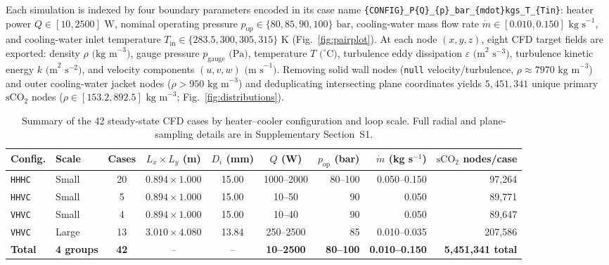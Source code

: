\documentclass[11pt]{article}
\begin{document}
Each simulation is indexed by four boundary parameters encoded in its case name \texttt{\{CONFIG\}\_P\{Q\}\_\{p\}\_bar\_\{mdot\}kgs\_T\_\{Tin\}}: heater power $Q \in [10, 2500]\text{ W}$, nominal operating pressure $p_{\mathrm{op}} \in \{80, 85, 90, 100\}\text{ bar}$, cooling-water mass flow rate $\dot{m} \in [0.010, 0.150]\text{ kg s}^{-1}$, and cooling-water inlet temperature $T_{\mathrm{in}} \in \{283.5, 300, 305, 315\}\text{ K}$ (Fig.~\ref{fig:pairplot}). At each node $(x,y,z)$, eight CFD target fields are exported: density $\rho\text{ (kg m}^{-3}\text{)}$, gauge pressure $p_{\mathrm{gauge}}\text{ (Pa)}$, temperature $T\text{ (}^\circ\text{C)}$, turbulence eddy dissipation $\varepsilon\text{ (m}^2\text{ s}^{-3}\text{)}$, turbulence kinetic energy $k\text{ (m}^2\text{ s}^{-2}\text{)}$, and velocity components $(u,v,w)\text{ (m s}^{-1}\text{)}$. Removing solid wall nodes (\texttt{null} velocity/turbulence, $\rho \approx 7970\text{ kg m}^{-3}$) and outer cooling-water jacket nodes ($\rho > 950\text{ kg m}^{-3}$) and deduplicating intersecting plane coordinates yields $5,451,341$ unique primary $\mathrm{sCO}_2$ nodes ($\rho \in [153.2, 892.5]\text{ kg m}^{-3}$; Fig.~\ref{fig:distributions}).

\begin{table}[!htbp]
\centering
\caption{Summary of the 42 steady-state CFD cases by heater--cooler configuration and loop scale. Full radial and plane-sampling details are in Supplementary Section~S1.}
\label{tab:dataset}
\small
\setlength{\tabcolsep}{4.8pt}
\begin{tabular}{llccccrrr}
\toprule
Config. & Scale & Cases & $L_x \times L_y$ (m) & $D_i$ (mm) & $Q$ (W) & $p_{\mathrm{op}}$ (bar) & $\dot{m}$ (kg s$^{-1}$) & $\mathrm{sCO}_2$ nodes/case \\
\midrule
\texttt{HHHC} & Small & 20 & $0.894 \times 1.000$ & 15.00 & 1000--2000 & 80--100 & 0.050--0.150 & 97,264 \\
\texttt{HHVC} & Small & 5  & $0.894 \times 1.000$ & 15.00 & 10--50     & 90      & 0.050        & 89,771 \\
\texttt{VHVC} & Small & 4  & $0.894 \times 1.000$ & 15.00 & 10--40     & 90      & 0.050        & 89,647 \\
\texttt{VHVC} & Large & 13 & $3.010 \times 4.080$ & 13.84 & 250--2500  & 85      & 0.010--0.035 & 207,586 \\
\midrule
\textbf{Total} & \textbf{4 groups} & \textbf{42} & -- & -- & \textbf{10--2500} & \textbf{80--100} & \textbf{0.010--0.150} & \textbf{5,451,341 total} \\
\bottomrule
\end{tabular}
\end{table}
\end{document}
